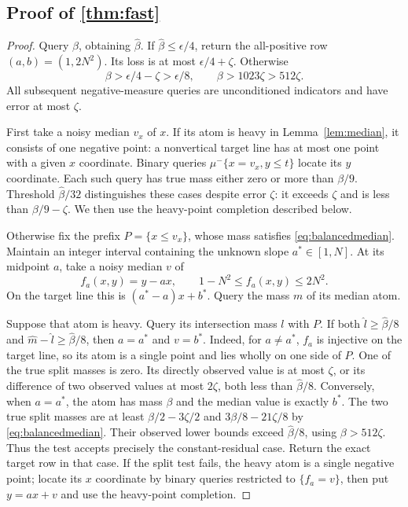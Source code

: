 \subsection[Proof of result fast]{Proof of \cref{thm:fast}}\label{proof:fast}
\begin{proof}
Query $\beta$, obtaining $\widehat\beta$. If $\widehat\beta\le\epsilon/4$, return the all-positive row $(a,b)=(1,2N^2)$. Its loss is at most $\epsilon/4+\zeta$. Otherwise
\[
 \beta>\epsilon/4-\zeta>\epsilon/8,
 \qquad \beta>1023\zeta>512\zeta.
\]
All subsequent negative-measure queries are unconditioned indicators and have error at most $\zeta$.

First take a noisy median $v_x$ of $x$. If its atom is heavy in Lemma~\ref{lem:median}, it consists of one negative point: a nonvertical target line has at most one point with a given $x$ coordinate. Binary queries $\mu^-\{x=v_x,y\le t\}$ locate its $y$ coordinate. Each such query has true mass either zero or more than $\beta/9$. Threshold $\widehat\beta/32$ distinguishes these cases despite error $\zeta$: it exceeds $\zeta$ and is less than $\beta/9-\zeta$. We then use the heavy-point completion described below.

Otherwise fix the prefix $P=\{x\le v_x\}$, whose mass satisfies \eqref{eq:balancedmedian}. Maintain an integer interval containing the unknown slope $a^*\in[1,N]$. At its midpoint $a$, take a noisy median $v$ of
\[
 f_a(x,y)=y-ax,
 \qquad 1-N^2\le f_a(x,y)\le2N^2.
\]
On the target line this is $(a^*-a)x+b^*$. Query the mass $m$ of its median atom.

Suppose that atom is heavy. Query its intersection mass $l$ with $P$. If both $\widehat l\ge\widehat\beta/8$ and $\widehat m-\widehat l\ge\widehat\beta/8$, then $a=a^*$ and $v=b^*$. Indeed, for $a\ne a^*$, $f_a$ is injective on the target line, so its atom is a single point and lies wholly on one side of $P$. One of the true split masses is zero. Its directly observed value is at most $\zeta$, or its difference of two observed values at most $2\zeta$, both less than $\widehat\beta/8$. Conversely, when $a=a^*$, the atom has mass $\beta$ and the median value is exactly $b^*$. The two true split masses are at least $\beta/2-3\zeta/2$ and $3\beta/8-21\zeta/8$ by \eqref{eq:balancedmedian}. Their observed lower bounds exceed $\widehat\beta/8$, using $\beta>512\zeta$. Thus the test accepts precisely the constant-residual case. Return the exact target row in that case. If the split test fails, the heavy atom is a single negative point; locate its $x$ coordinate by binary queries restricted to $\{f_a=v\}$, then put $y=ax+v$ and use the heavy-point completion.


\end{proof}
